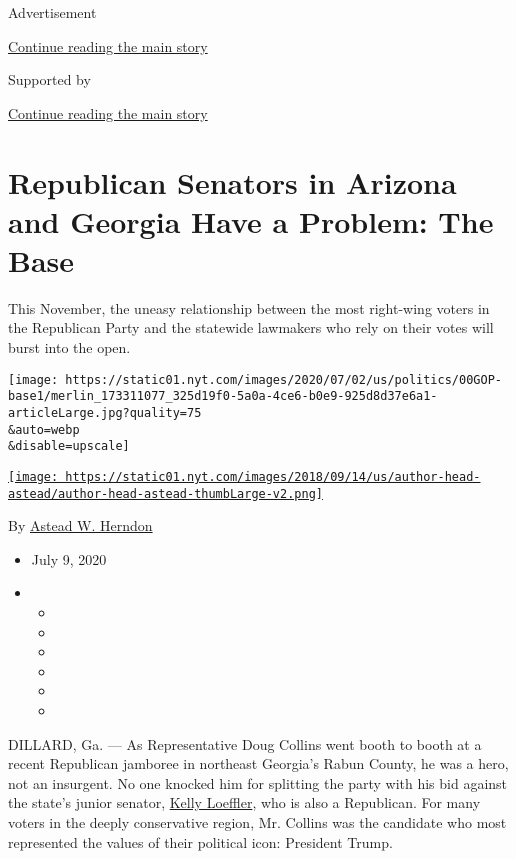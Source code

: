 Advertisement

\protect\hyperlink{after-top}{Continue reading the main story}

Supported by

\protect\hyperlink{after-sponsor}{Continue reading the main story}

\hypertarget{republican-senators-in-arizona-and-georgia-have-a-problem-the-base}{%
\section{Republican Senators in Arizona and Georgia Have a Problem: The
Base}\label{republican-senators-in-arizona-and-georgia-have-a-problem-the-base}}

This November, the uneasy relationship between the most right-wing
voters in the Republican Party and the statewide lawmakers who rely on
their votes will burst into the open.

\texttt{[image: https://static01.nyt.com/images/2020/07/02/us/politics/00GOP-base1/merlin\_173311077\_325d19f0-5a0a-4ce6-b0e9-925d8d37e6a1-articleLarge.jpg?quality=75\\\&auto=webp\\\&disable=upscale]}

\href{https://www.nytimes.com/by/astead-w-herndon}{\texttt{[image: https://static01.nyt.com/images/2018/09/14/us/author-head-astead/author-head-astead-thumbLarge-v2.png]}}

By \href{https://www.nytimes.com/by/astead-w-herndon}{Astead W. Herndon}

\begin{itemize}
\item
  July 9, 2020
\item
  \begin{itemize}
  \item
  \item
  \item
  \item
  \item
  \item
  \end{itemize}
\end{itemize}

DILLARD, Ga. --- As Representative Doug Collins went booth to booth at a
recent Republican jamboree in northeast Georgia's Rabun County, he was a
hero, not an insurgent. No one knocked him for splitting the party with
his bid against the state's junior senator,
\href{https://www.nytimes.com/2020/07/09/sports/basketball/kelly-loeffler-atlanta-dream-protests.html}{Kelly
Loeffler}, who is also a Republican. For many voters in the deeply
conservative region, Mr. Collins was the candidate who most represented
the values of their political icon: President Trump.

